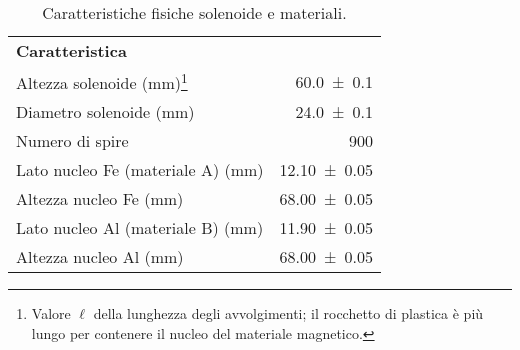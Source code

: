 \squeezetable
\begin{table}[h]
    \begin{ruledtabular}
        \caption{Caratteristiche fisiche solenoide e materiali.}
        \label{tab:L_caratt}
        \begin{tabular}{lr}
            \bf{Caratteristica} & \\
            \colrule
            Altezza solenoide (mm)\footnote{Valore $\ell$ della lunghezza degli avvolgimenti; il rocchetto di plastica è più lungo per contenere il nucleo del materiale magnetico.}              
                                                & \num{60.0  +- 0.1 } \\
            Diametro solenoide (mm)             & \num{24.0  +- 0.1 } \\
            Numero di spire                     & \num{900          } \\
            Lato nucleo Fe (materiale A) (mm)   & \num{12.10 +- 0.05} \\
            Altezza nucleo Fe (mm)              & \num{68.00 +- 0.05} \\
            Lato nucleo Al (materiale B) (mm)   & \num{11.90 +- 0.05} \\
            Altezza nucleo Al (mm)              & \num{68.00 +- 0.05} \\
        \end{tabular}
    \end{ruledtabular}
\end{table}